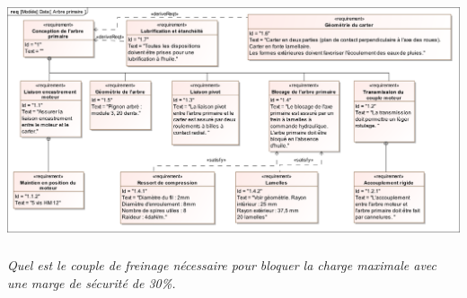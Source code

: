 \documentclass[10pt]{article}
\newif\ifprof
\begin{document}
\begin{center}
\includegraphics[width=\textwidth]{images/SysML/ArbrePrimaire.png}
\end{center}
%
\fi
\subparagraph{}
\textit{Quel est le couple de freinage nécessaire pour bloquer la charge maximale avec une marge de sécurité de 30\%.}

\ifprof
\begin{corrige}
La charge maximale que le treuil doit pouvoir lever est de 7,5 kN. Le diamètre maximal d'enroulement sur l'arbre de sortie est de 500 mm. Le couple maximal sur l'arbre de sortie est donc $C_S = 500\cdot 10^{-3}\cdot 7,5\cdot 10^{3} = 3\, 750 \; \text{Nm}.$

On a : $\dfrac{\omega_S}{\omega_E} =\dfrac{1}{k_T}= (-1)^2 \dfrac{20\cdot 15}{80\cdot 70}$ et dans l'hypothèse ou le rendement est unitaire, on a : $C_E = \dfrac{C_S}{k_T} \simeq 201\; \text{Nm}$. 

En tenant compte de le marge de sécurité de 30\%, le couple à fournir est de $260\; \text{Nm}$.

\end{corrige}
\else
\fi
\end{document}
